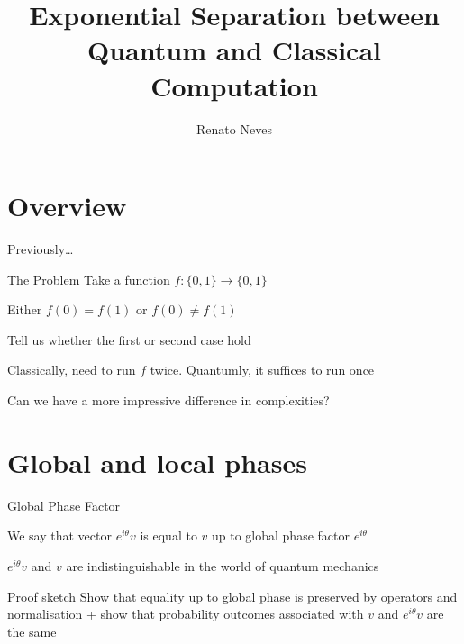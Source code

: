 \documentclass{beamer}
\author[Renato Neves]{Renato Neves}
\date{}
\begin{document}
\title{Exponential Separation between Quantum and Classical Computation}

\frame[plain]{\titlepage}

\section{Overview}

\begin{frame}{Previously\dots}

        \begin{block}{The Problem}
        Take a function $f : \{0,1\} \to \{0,1\}$

        Either $f(0) = f(1)$ or $f(0) \not = f(1)$

        Tell us whether the first or second case hold
        \end{block}

        Classically, need to run $f$ \alert{twice}.  Quantumly, it suffices to
        run \alert{once}

        \pause
        Can we have a more impressive difference in complexities?

\end{frame}

\section{Global and local phases}

\begin{frame}{Global Phase Factor}

        We say that vector $e^{i\theta}v$ is equal to $v$
        up to \alert{global phase factor} $e^{i \theta}$

        \vfill
        \begin{theorem}
         $e^{i\theta}v$ and $v$ are indistinguishable
         in the world of quantum mechanics
        \end{theorem}

        \begin{block}{Proof sketch}
                Show that equality up to global phase is preserved by operators
                and normalisation + show that probability outcomes associated
                with $v$ and $e^{i\theta}v$ are the same
        \end{block}
\end{frame}
\end{document}
